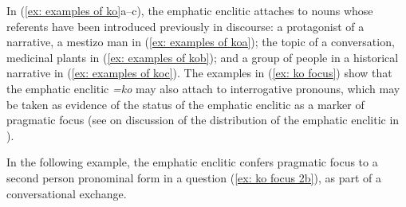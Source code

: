     \z
\z

In (\ref{ex: examples of ko}a--c), the emphatic enclitic attaches to nouns whose referents have been introduced previously in discourse: a protagonist of a narrative, a mestizo man in (\ref{ex: examples of koa}); the topic of a conversation, medicinal plants in (\ref{ex: examples of kob}); and a group of people in a historical narrative in (\ref{ex: examples of koc}). The examples in (\ref{ex: ko focus}) show that the emphatic enclitic \textit{=ko} may also attach to interrogative pronouns, which may be taken as evidence of the status of the emphatic enclitic as a marker of pragmatic focus (see \citet{moralesmoreno2016rochecahi} on discussion of the distribution of the emphatic enclitic in ).


\ea\label{ex: ko focus}



    \z
\z

In the following example, the emphatic enclitic confers pragmatic focus to a second person pronominal form in a question (\ref{ex: ko focus 2b}), as part of a conversational exchange.

